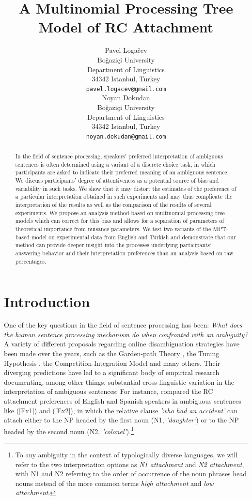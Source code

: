 \documentclass[11pt]{article}\usepackage[]{graphicx}\usepackage[]{color}
\title{A Multinomial Processing Tree Model of RC Attachment}
\author{Pavel Logačev \\
  Boğaziçi University \\
  Department of Linguistics \\
  34342 Istanbul, Turkey \\
  \texttt{pavel.logacev@gmail.com} \\\And
  Noyan Dokudan \\
  Boğaziçi University \\
  Department of Linguistics \\
  34342 Istanbul, Turkey \\
  \texttt{noyan.dokudan@gmail.com} \\}
\begin{document}
\maketitle
\begin{abstract}
In the field of sentence processing, speakers' preferred interpretation of ambiguous sentences is often determined using a variant of a discrete choice task, in which participants are asked to indicate their preferred meaning of an ambiguous sentence. We discuss participants' degree of attentiveness as a potential source of bias and variability in such tasks. We show that it may distort the estimates of the preference of a particular interpretation obtained in such experiments and may thus complicate the interpretation of the results as well as the comparison of the results of several experiments. 
We propose an analysis method based on multinomial processing tree models \citep{BatchelderRiefer:1999} which can correct for this bias and allows for a separation of parameters of theoretical importance from nuisance parameters. We test two variants of the MPT-based model on experimental data from English and Turkish and demonstrate that our method can provide deeper insight into the processes underlying participants' answering behavior and their interpretation preferences than an analysis based on raw percentages. 
\end{abstract}

\section{Introduction}

One of the key questions in the field of sentence processing has been: \textit{What does the human sentence processing mechanism do when confronted with an ambiguity?} A variety of different proposals regarding online disambiguation strategies have been made over the years, such as the Garden-path Theory \citep{Frazier:1987}, the Tuning Hypothesis \citep{CuetosEtAl:1996}, the Competition-Integration Model \cite{McRaeEtAl:1998} and many others. 
Their diverging predictions have led to a significant body of empirical research documenting, among other things, substantial cross-linguistic variation in the interpretation of ambiguous sentences: 
For instance, \citet{CuetosMitchell:1988} compared the RC attachment preferences of English and Spanish speakers in ambiguous sentences like (\ref{Ex1}) and (\ref{Ex2}), in which the relative clause \textit{'who had an accident'} can attach either to the NP headed by the first noun (N1, \textit{'daughter'}) or to the NP headed by the second noun (N2, \textit{'colonel'}).\footnote{To any ambiguity in the context of typologically diverse languages, we will refer to the two interpretation options as \textit{N1 attachment} and \textit{N2 attachment}, with N1 and N2 referring to the order of occurrence of the noun phrases head nouns instead of the more common terms \textit{high attachment} and \textit{low attachment}.} 
\end{document}
